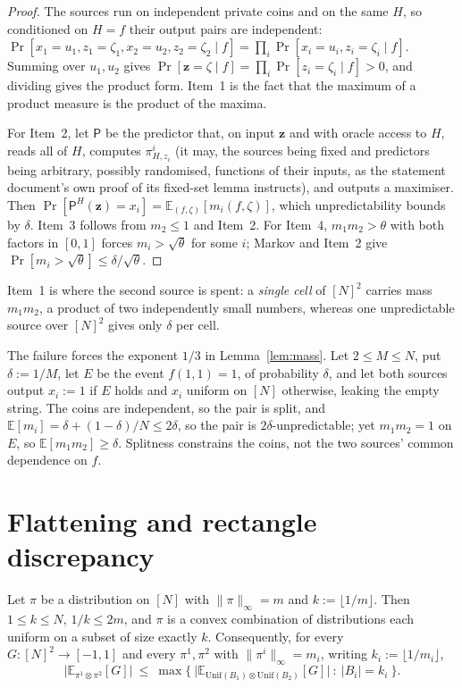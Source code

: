 \documentclass{aicr-solution}
\newcommand{\Prob}[1]{\Pr\!\left[#1\right]}
\newcommand{\Exp}{\mathbb{E}}
\newcommand{\vz}{\mathbf{z}}
\newcommand{\Unif}{\mathrm{Unif}}
\begin{document}
\begin{proof}
The sources run on independent private coins and on the same $H$, so conditioned
on $H=f$ their output pairs are independent:
$\Prob{x_1=u_1,z_1=\zeta_1,x_2=u_2,z_2=\zeta_2\mid f}=\prod_i\Prob{x_i=u_i,z_i=\zeta_i\mid f}$.
Summing over $u_1,u_2$ gives
$\Prob{\vz=\zeta\mid f}=\prod_i\Prob{z_i=\zeta_i\mid f}>0$, and dividing gives the
product form. Item~1 is the fact that the maximum of a product measure is the
product of the maxima.

For Item~2, let $\mathsf P$ be the predictor that, on input $\vz$ and with oracle
access to $H$, reads all of $H$, computes $\pi^{i}_{H,z_i}$ (it may, the
sources being fixed and predictors being arbitrary, possibly randomised,
functions of their inputs, as the statement document's own proof of its
fixed-set lemma instructs), and outputs a maximiser. Then
$\Prob{\mathsf P^{H}(\vz)=x_i}=\Exp_{(f,\zeta)}[m_i(f,\zeta)]$, which
unpredictability bounds by $\delta$. Item~3 follows from $m_2\le1$ and Item~2.
For Item~4, $m_1m_2>\theta$ with both factors in $[0,1]$ forces
$m_i>\sqrt\theta$ for some $i$; Markov and Item~2 give
$\Prob{m_i>\sqrt\theta}\le\delta/\sqrt\theta$.
\end{proof}

Item~1 is where the second source is spent: a \emph{single cell} of $[N]^2$
carries mass $m_1m_2$, a product of two independently small numbers, whereas one
unpredictable source over $[N]^2$ gives only $\delta$ per cell.

\begin{remark}[{$\Exp[m_1m_2]\le\delta^{2}$ is false}]\label{rem:corr}
The failure forces the exponent $1/3$ in
Lemma~\ref{lem:mass}. Let $2\le M\le N$, put $\delta:=1/M$, let $E$ be the event
$f(1,1)=1$, of probability $\delta$, and let both sources output $x_i:=1$ if $E$
holds and $x_i$ uniform on $[N]$ otherwise, leaking the empty string. The coins
are independent, so the pair is split, and
$\Exp[m_i]=\delta+(1-\delta)/N\le2\delta$, so the pair is
$2\delta$-unpredictable; yet $m_1m_2=1$ on $E$, so $\Exp[m_1m_2]\ge\delta$.
Splitness constrains the coins, not the two sources' common dependence on $f$.
\end{remark}

\section{Flattening and rectangle discrepancy}

\begin{lemma}[flattening]\label{lem:flat}
Let $\pi$ be a distribution on $[N]$ with $\|\pi\|_\infty=m$ and
$k:=\lfloor1/m\rfloor$. Then $1\le k\le N$, $1/k\le2m$, and $\pi$ is a convex
combination of distributions each uniform on a subset of size exactly $k$.
Consequently, for every $G:[N]^{2}\to[-1,1]$ and every $\pi^{1},\pi^{2}$ with
$\|\pi^{i}\|_\infty=m_i$, writing $k_i:=\lfloor1/m_i\rfloor$,
\[
  \bigl|\Exp_{\pi^{1}\otimes\pi^{2}}[G]\bigr|\ \le\
  \max\bigl\{\ \bigl|\Exp_{\Unif(B_1)\otimes\Unif(B_2)}[G]\bigr|\ :\ |B_i|=k_i\ \bigr\}.
\]
\end{lemma}
\end{document}
